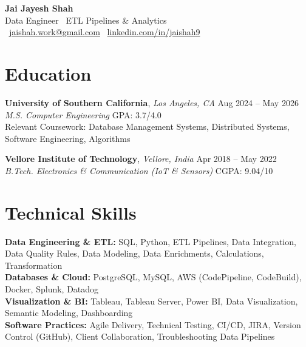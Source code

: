 \documentclass[letterpaper,11pt]{article}
\begin{document}
\begin{center}
    {\LARGE \textbf{Jai Jayesh Shah}}\\
    {\normalsize Data Engineer \textbar\ ETL Pipelines \& Analytics}\\
    \small
    \faEnvelope\ \href{mailto:jaishah.work@gmail.com}{jaishah.work@gmail.com}
    \quad
    \faLinkedin\ \href{https://www.linkedin.com/in/jaishah9}{linkedin.com/in/jaishah9}
\end{center}
\vspace{-16pt}


\section*{Education}
\textbf{University of Southern California}, \textit{Los Angeles, CA} \hfill Aug 2024 -- May 2026 \\
\textit{M.S. Computer Engineering} \hfill GPA: 3.7/4.0 \\
Relevant Coursework: Database Management Systems, Distributed Systems, Software Engineering, Algorithms

\textbf{Vellore Institute of Technology}, \textit{Vellore, India }\hfill Apr 2018 -- May 2022 \\
\textit{B.Tech. Electronics \& Communication (IoT \& Sensors)} \hfill CGPA: 9.04/10


\section*{Technical Skills}
\textbf{Data Engineering \& ETL:} SQL, Python, ETL Pipelines, Data Integration, Data Quality Rules, Data Modeling, Data Enrichments, Calculations, Transformation \\
\textbf{Databases \& Cloud:} PostgreSQL, MySQL, AWS (CodePipeline, CodeBuild), Docker, Splunk, Datadog \\
\textbf{Visualization \& BI:} Tableau, Tableau Server, Power BI, Data Visualization, Semantic Modeling, Dashboarding \\
\textbf{Software Practices:} Agile Delivery, Technical Testing, CI/CD, JIRA, Version Control (GitHub), Client Collaboration, Troubleshooting Data Pipelines


\end{document}
